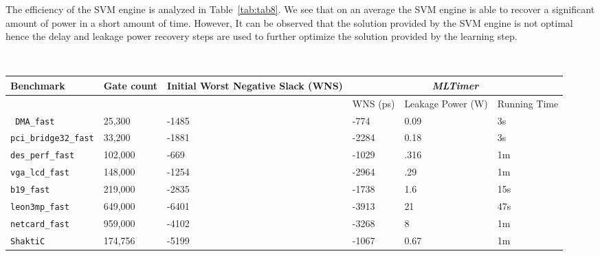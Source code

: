
The efficiency of the SVM engine is analyzed in Table~\ref{tab:tab8}. We see that on an average the SVM engine is able to recover a significant amount of power in a short amount of time. However, It can be observed that the solution provided by the SVM engine is not optimal hence  the delay and leakage power recovery steps are used to further optimize the solution provided by the learning step.

 \begin{table*}[!t]
  \caption{Leakage and Running Time Comparisons for ISPD benchmarks and ShaktiC with just SVM. In the table, {\bf h}, {\bf m} and {\bf s} stand for hours, minutes and seconds respectively. It can be seen that with the exception of leon3mp our SVM implementation is able to recover significant delay and power.} \
\label{tab:tab8}

     \begin{center}
 \begin{tabular}{|p{4.2cm}|p{2cm}|p{2.2cm}|p{2cm}|p{2cm}|p{2cm}|}
 \hline
    \textbf{Benchmark} & \textbf{Gate count} & \textbf{Initial Worst Negative Slack (WNS)} & \multicolumn{3}{|c|}{ \textit{MLTimer}}  \\
 \hline
   &   & & WNS (ps) &  Leakage Power (W)      & Running Time          \\
 \hline
     \texttt{ DMA\_fast} & 25,300&  -1485 & -774 &0.09  & 3s \\
 \hline
     \texttt{pci\_bridge32\_fast}	& 33,200& -1881 & -2284	&	0.18   &	3s	 \\
 \hline
     \texttt{des\_perf\_fast} &  102,000 & -669 & -1029 &.316 & 1m        \\
 \hline
     \texttt{vga\_lcd\_fast} & 148,000 & -1254 & -2964 &.29 & 1m          \\
\hline

     \texttt{b19\_fast}	&	219,000 & -2835 & -1738	&	1.6 	&	15s	\\ \hline
     \texttt{leon3mp\_fast} & 649,000 & -6401 & -3913 & 21 &  47s \\
 \hline

     \texttt{netcard\_fast} & 959,000 & -4102 &-3268 & 8 & 1m  \\ \hline
     \texttt{ShaktiC} & 174,756 & -5199 & -1067 & 0.67 & 1m \\ 
 \hline
 \end{tabular}
 \end{center}

 \end{table*}
